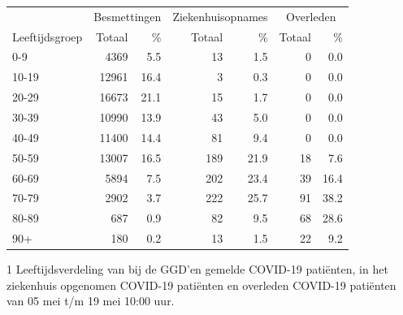 \documentclass[
  english,
  man,floatsintext]{apa6}
\begin{document}
\begin{table}
\centering\begingroup\fontsize{11}{13}\selectfont

\begin{threeparttable}
\begin{tabular}{lrrrrrr}
\toprule
\multicolumn{1}{c}{ } & \multicolumn{2}{c}{Besmettingen} & \multicolumn{2}{c}{Ziekenhuisopnames} & \multicolumn{2}{c}{Overleden} \\
\cmidrule(l{3pt}r{3pt}){2-3} \cmidrule(l{3pt}r{3pt}){4-5} \cmidrule(l{3pt}r{3pt}){6-7}
Leeftijdsgroep & Totaal & \% & Totaal & \% & Totaal & \%\\
\midrule
0-9 & 4369 & 5.5 & 13 & 1.5 & 0 & 0.0\\
10-19 & 12961 & 16.4 & 3 & 0.3 & 0 & 0.0\\
20-29 & 16673 & 21.1 & 15 & 1.7 & 0 & 0.0\\
30-39 & 10990 & 13.9 & 43 & 5.0 & 0 & 0.0\\
40-49 & 11400 & 14.4 & 81 & 9.4 & 0 & 0.0\\
50-59 & 13007 & 16.5 & 189 & 21.9 & 18 & 7.6\\
60-69 & 5894 & 7.5 & 202 & 23.4 & 39 & 16.4\\
70-79 & 2902 & 3.7 & 222 & 25.7 & 91 & 38.2\\
80-89 & 687 & 0.9 & 82 & 9.5 & 68 & 28.6\\
90+ & 180 & 0.2 & 13 & 1.5 & 22 & 9.2\\
\bottomrule
\end{tabular}
\begin{tablenotes}
\item[1] Leeftijdsverdeling van bij de GGD’en gemelde COVID-19 patiënten, in het ziekenhuis opgenomen COVID-19 patiënten en overleden COVID-19 patiënten van 05 mei t/m 19 mei 10:00 uur.
\end{tablenotes}
\end{threeparttable}
\endgroup{}
\end{table}

\newpage
\end{document}
